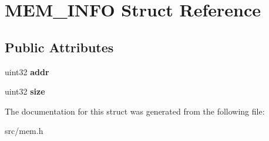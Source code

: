 \hypertarget{struct_m_e_m___i_n_f_o}{}\section{M\+E\+M\+\_\+\+I\+N\+F\+O Struct Reference}
\label{struct_m_e_m___i_n_f_o}
\subsection*{Public Attributes}
\begin{DoxyCompactItemize}
\item 
\hypertarget{struct_m_e_m___i_n_f_o_ab669dc2d407a2b7fc297ab7719200ab9}{}uint32 {\bfseries addr}\label{struct_m_e_m___i_n_f_o_ab669dc2d407a2b7fc297ab7719200ab9}

\item 
\hypertarget{struct_m_e_m___i_n_f_o_a806db9f9ddf810446a02a9b1e24487bd}{}uint32 {\bfseries size}\label{struct_m_e_m___i_n_f_o_a806db9f9ddf810446a02a9b1e24487bd}

\end{DoxyCompactItemize}


The documentation for this struct was generated from the following file\+:\begin{DoxyCompactItemize}
\item 
src/mem.\+h\end{DoxyCompactItemize}

